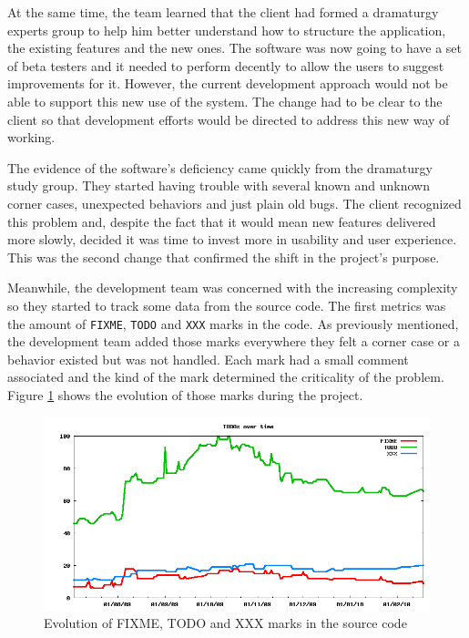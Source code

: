 \documentclass[lnbip]{svmultln}
\begin{document}
At the same time, the team learned that the client had formed a dramaturgy
experts group to help him better understand how to structure the application,
the existing features and the new ones. The software was now going to have a set
of beta testers and it needed to perform decently to allow the users to suggest
improvements for it. However, the current development approach would not be able
to support this new use of the system. The change had to be clear to the client
so that development efforts would be directed to address this new way of
working.

The evidence of the software's deficiency came quickly from the
dramaturgy study group. They started having trouble with several known and
unknown corner cases, unexpected behaviors and just plain old bugs. The client
recognized this problem and, despite the fact that it would mean new features
delivered more slowly, decided it was time to invest more in usability and user
experience. This was the second change that confirmed the shift in the project's
purpose.

Meanwhile, the development team was concerned with the increasing complexity so
they started to track some data from the source code. The first metrics was the
amount of \texttt{FIXME}, \texttt{TODO} and \texttt{XXX} marks in the code. As
previously mentioned, the development team added those marks everywhere they
felt a corner case or a behavior existed but was not handled. Each mark had a
small comment associated and the kind of the mark determined the criticality of
the problem. Figure \ref{fig:TODOs} shows the evolution of those marks during
the project.

\begin{figure}[hbt]
  \centerline{
    \includegraphics[width=120mm]{TODOs.png}
  }
  \caption{Evolution of FIXME, TODO and XXX marks in the source code}
  \label{fig:TODOs}
\end{figure}
\end{document}
